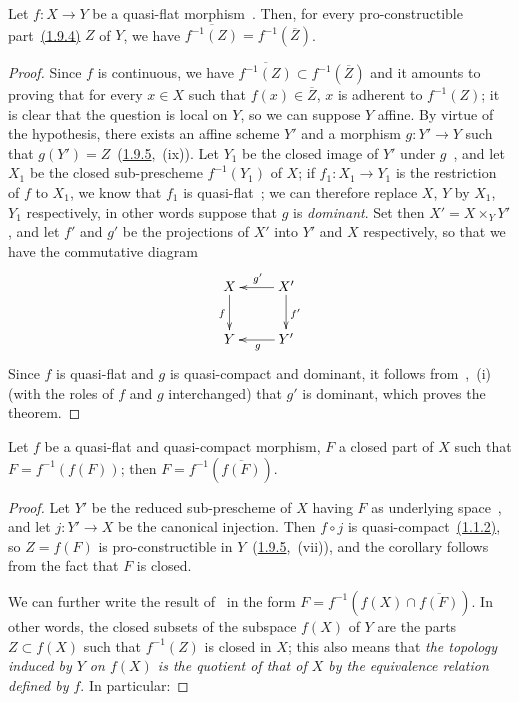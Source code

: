 \begin{theorem}[2.3.10]
\label{IV.2.3.10}
Let $f:X\to Y$ be a quasi-flat morphism~.
Then, for every pro-constructible part~{\hyperlink{ega4.c04.def.1-9-4}{(1.9.4)}} $Z$ of $Y$, we have $\overline{f^{-1}(Z)}=f^{-1}(\overline{Z})$.
\end{theorem}

\begin{proof}
Since $f$ is continuous, we have $\overline{f^{-1}(Z)}\subset f^{-1}(\overline{Z})$ and it amounts to proving that for every $x\in X$ such that $f(x)\in\overline{Z}$, $x$ is adherent to $f^{-1}(Z)$;
it is clear that the question is local on $Y$, so we can suppose $Y$ affine.
By virtue of the hypothesis, there exists an affine scheme $Y'$ and a morphism $g:Y'\to Y$ such that $g(Y')=Z$~({\hyperlink{ega4.c04.prop.1-9-5}{1.9.5}},~(ix)).
Let $Y_1$ be the closed image of $Y'$ under $g$~, and let $X_1$ be the closed sub-prescheme $f^{-1}(Y_1)$ of $X$; if $f_1:X_1\to Y_1$ is the restriction of $f$ to $X_1$, we know that $f_1$ is quasi-flat~; we can therefore replace $X$, $Y$ by $X_1$, $Y_1$ respectively, in other words suppose that $g$ is \emph{dominant}.
Set then $X'=X\times_Y Y'$, and let $f'$ and $g'$ be the projections of $X'$ into $Y'$ and $X$ respectively, so that we have the commutative diagram
\[
\xymatrix{
  X \ar[d]_f & X' \ar[l]_{g'} \ar[d]^{f'} \\
  Y & Y' \ar[l]^g
}
\]
Since $f$ is quasi-flat and $g$ is quasi-compact and dominant, it follows from~,~(i) (with the roles of $f$ and $g$ interchanged) that $g'$ is dominant, which proves the theorem.
\end{proof}

\begin{corollary}[2.3.11]
\label{IV.2.3.11}
Let $f$ be a quasi-flat and quasi-compact morphism, $F$ a closed part of $X$ such that $F=f^{-1}(f(F))$; then $F=f^{-1}(\overline{f(F)})$.
\end{corollary}

\begin{proof}
Let $Y'$ be the reduced sub-prescheme of $X$ having $F$ as underlying space~, and let $j:Y'\to X$ be the canonical injection.
Then $f\circ j$ is quasi-compact~{\hyperlink{ega4.c04.prop.1-1-2}{(1.1.2)}}, so $Z=f(F)$ is pro-constructible in $Y$~({\hyperlink{ega4.c04.prop.1-9-5}{1.9.5}},~(vii)), and the corollary follows from the fact that $F$ is closed.

We can further write the result of~ in the form $F=f^{-1}(f(X)\cap\overline{f(F)})$.
In other words, the closed subsets of the subspace $f(X)$ of $Y$ are the parts $Z\subset f(X)$ such that $f^{-1}(Z)$ is closed in $X$; this also means that \emph{the topology induced by $Y$ on $f(X)$ is the quotient of that of $X$ by the equivalence relation defined by $f$}.
In particular:
\end{proof}

